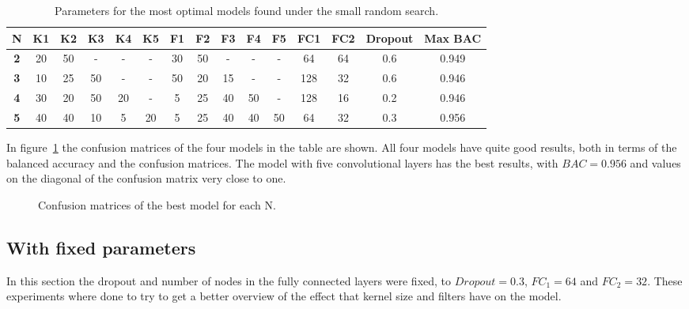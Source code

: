 \begin{table}[H]
    \centering
    \begin{tabular}{|c|c|c|c|c|c|c|c|c|c|c|c|c|c|c|}
        \hline
        \textbf{N} & \textbf{K1} & \textbf{K2} & \textbf{K3} & \textbf{K4} & \textbf{K5} & \textbf{F1} & \textbf{F2} & \textbf{F3} & \textbf{F4} & \textbf{F5} & \textbf{FC1} & \textbf{FC2} & \textbf{Dropout} & \textbf{Max BAC} \\ \hline
        \textbf{2} & 20 & 50 & - & - & - & 30 & 50 & - & - & - & 64 & 64 & 0.6 & 0.949 \\
        \textbf{3} & 10 & 25 & 50 & - & - & 50 & 20 & 15 & - & - & 128 & 32 & 0.6 & 0.946 \\
        \textbf{4} & 30 & 20 & 50 & 20 & - & 5 & 25 & 40 & 50 & - & 128 & 16 & 0.2 & 0.946 \\
        \textbf{5} & 40 & 40 & 10 & 5 & 20 & 5 & 25 & 40 & 40 & 50 & 64 & 32 & 0.3 & 0.956 \\
        \hline
    \end{tabular}
    \captionsetup{width=0.95\linewidth}
    \caption{Parameters for the most optimal models found under the small random search.}
    \label{tab:opt_parameters}
\end{table}


In figure~\ref{fig:confus} the confusion matrices of the four models in the table are shown. All four models have quite good results, both in terms of the balanced accuracy and the confusion matrices. The model with five convolutional layers has the best results, with $BAC=0.956$ and values on the diagonal of the confusion matrix very close to one.

\begin{figure}[H]
    \centering
    
    \captionsetup{width=0.95\linewidth}
    \caption{Confusion matrices of the best model for each N.}
    \label{fig:confus}
\end{figure}


\subsection{With fixed parameters}

In this section the dropout and number of nodes in the fully connected layers were fixed, to $Dropout=0.3$, $FC_1=64$ and $FC_2=32$. These experiments where done to try to get a better overview of the effect that kernel size and filters have on the model.


